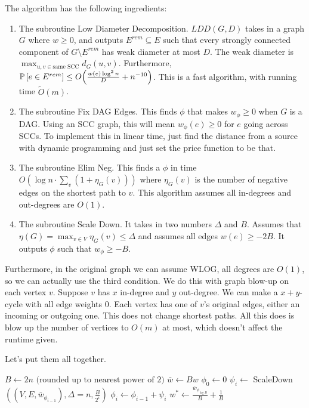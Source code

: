 The algorithm has the following ingredients:
\begin{enumerate}
    \item The subroutine Low Diameter Decomposition. $LDD(G, D)$ takes in a graph $G$ where $w \geq 0$, and outputs $E^{rem} \subseteq E$ such that every strongly connected component of $G \setminus E^{rem}$
    has weak diameter at most $D$. The weak diameter is $\max_{u, v \in \text{same SCC}} d_G(u, v)$. Furthermore, $\mathbb{P}\left[ e \in E^{rem} \right] \leq O\qty(\frac{w(e) \log^2 n}{D} + n^{-10})$. This is a fast algorithm, with running time $\tilde{O}(m)$.
    \item The subroutine Fix DAG Edges. This finds $\phi$ that makes $w_{\phi} \geq 0$ when $G$ is a DAG. Using an SCC graph, this will mean $w_{\phi}(e) \geq 0$ for $e$ going across SCCs.
    To implement this in linear time, just find the distance from a source with dynamic programming and just set the price function to be that.
    \item The subroutine Elim Neg. This finds a $\phi$ in time $O(\log n \cdot \sum_v (1 + \eta_G(v)))$ where $\eta_G(v)$ is the number of negative edges
    on the shortest path to $v$. This algorithm assumes all in-degrees and out-degrees are $O(1)$.
    \item The subroutine Scale Down. It takes in two numbers $\Delta$ and $B$. Assumes that $\eta(G) = \max_{v \in V} \eta_G(v) \leq \Delta$ and assumes all edges $w(e) \geq -2B$. It outputs $\phi$ such that $w_{\phi} \geq -B$.
\end{enumerate}

Furthermore, in the original graph we can assume WLOG, all degrees are $O(1)$, so we can actually use the third condition. We do this with graph blow-up on each vertex
$v$. Suppose $v$ has $x$ in-degree and $y$ out-degree. We can make a $x + y$-cycle with all edge weights $0$. Each vertex has one of $v$'s original edges, either an incoming or outgoing one.
This does not change shortest paths. All this does is blow up the number of vertices to $O(m)$ at most, which doesn't affect the runtime given.

Let's put them all together.
\begin{algothm}
    \begin{algorithmic}
        \State $B \gets 2n \text{ (rounded up to nearest power of 2)}$
        \State $\bar{w} \gets B w$
        \State $\phi_0 \gets 0$
            \State $\psi_i \gets$ ScaleDown$((V, E, \bar{w}_{\phi_{i - 1}}), \Delta = n, \frac{B}{2^i})$
            \State $\phi_i \gets \phi_{i - 1} + \psi_i$
        \EndFor
        \State $w^* \gets \frac{\bar{w}_{\phi_{\log B}}}{B} + \frac{1}{B}$
    \EndFunction
    \end{algorithmic}
\end{algothm}